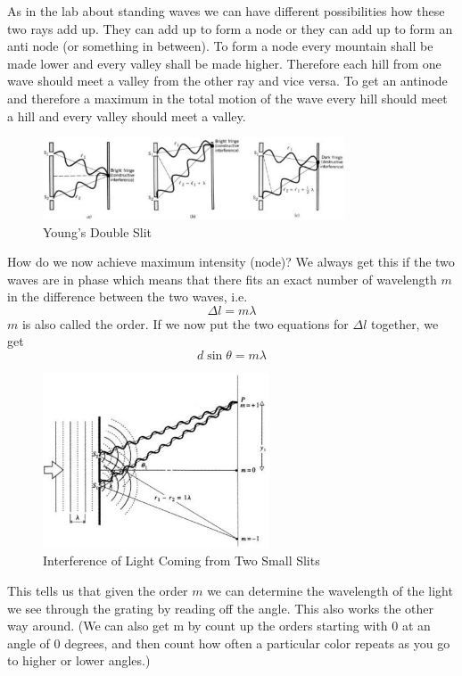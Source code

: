 As in the lab about standing waves we can have different possibilities how these two rays add up. They can add up to form a node or they can add up to form an anti node (or something in between). To form a node every mountain shall be made lower and every valley shall be made higher. Therefore each hill from one wave should meet a valley from the other ray and vice versa. To get an antinode and therefore a maximum in the total motion of the wave every hill should meet a hill and every valley should meet a valley.
\begin{figure}[h]
\centering
\includegraphics[width=0.8\textwidth]{./Exp9/pic/image2.png}
\caption{Young's Double Slit}
\end{figure} 

How do we now achieve maximum intensity (node)? We always get this if the two waves are in phase which means that there fits an exact number of wavelength $m$ in the difference between the two waves, i.e.
\begin{equation}
  \Delta l=m\lambda
\end{equation}
$m$ is also called the order. If we now put the two equations for $\Delta l$ together, we get
\begin{equation}
  d\sin\theta=m\lambda
  \label{eq:dsin}
\end{equation}
\begin{figure}[h]
\centering
\includegraphics[width=0.6\textwidth]{./Exp9/pic/image3.png}
\caption{Interference of Light Coming from Two Small Slits}
\end{figure} 

This tells us that given the order $m$ we can determine the wavelength of the light we see through the grating by reading off the angle. This also works the other way around. (We can also get m by count up the orders starting with 0 at an angle of 0 degrees, and then count how often a particular color repeats as you go to higher or lower angles.)


